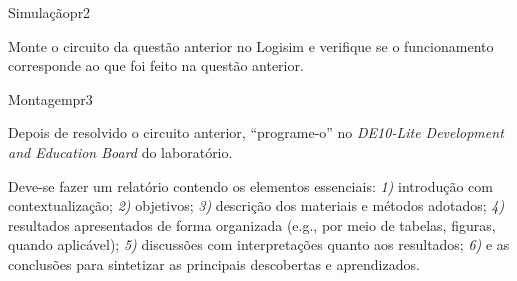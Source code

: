 \begin{problem}{Simulação}{pr2}

Monte o circuito da questão anterior no Logisim e verifique se o funcionamento corresponde ao que foi feito na questão anterior. \\

\end{problem}

\begin{problem}{Montagem}{pr3}
    
Depois de resolvido o circuito anterior, ``programe-o'' no \textit{DE10-Lite Development and Education Board} do laboratório.

\end{problem}

\begin{obs}

Deve-se fazer um relatório contendo os elementos essenciais: \textit{1)} introdução com contextualização; \textit{2)} objetivos; \textit{3)} descrição dos materiais e métodos adotados; \textit{4)} resultados apresentados de forma organizada (e.g., por meio de tabelas, figuras, quando aplicável); \textit{5)} discussões com interpretações quanto aos resultados; \textit{6)} e as conclusões para sintetizar as principais descobertas e aprendizados.

\end{obs}

\newpage

\printbibliography


